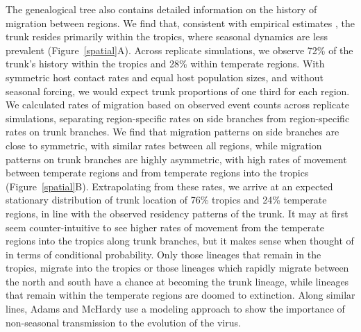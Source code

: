 \documentclass[11pt,oneside,letterpaper]{article}
\begin{document}
The genealogical tree also contains detailed information on the history of migration between regions.  We find that, consistent with empirical estimates \cite{Russell08,Bedford10}, the trunk resides primarily within the tropics, where seasonal dynamics are less prevalent (Figure~\ref{spatial}A).  Across replicate simulations, we observe 72\% of the trunk's history within the tropics and 28\% within temperate regions.  With symmetric host contact rates and equal host population sizes, and without seasonal forcing, we would expect trunk proportions of one third for each region.  We calculated rates of migration based on observed event counts across replicate simulations, separating region-specific rates on side branches from region-specific rates on trunk branches.  We find that migration patterns on side branches are close to symmetric, with similar rates between all regions, while migration patterns on trunk branches are highly asymmetric, with high rates of movement between temperate regions and from temperate regions into the tropics (Figure~\ref{spatial}B).  Extrapolating from these rates, we arrive at an expected stationary distribution of trunk location of 76\% tropics and 24\% temperate regions, in line with the observed residency patterns of the trunk.  It may at first seem counter-intuitive to see higher rates of movement from the temperate regions into the tropics along trunk branches, but it makes sense when thought of in terms of conditional probability.  Only those lineages that remain in the tropics, migrate into the tropics or those lineages which rapidly migrate between the north and south have a chance at becoming the trunk lineage, while lineages that remain within the temperate regions are doomed to extinction.  Along similar lines, Adams and McHardy \cite{Adams11} use a modeling approach to show the importance of non-seasonal transmission to the evolution of the virus.
\end{document}
